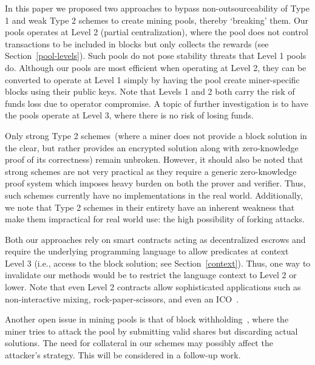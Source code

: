 \documentclass[runningheads]{llncs}
\begin{document}
In this paper we proposed two approaches to bypass non-outsourceability of Type 1 and weak Type 2
schemes to create mining pools, thereby `breaking' them. Our pools operates at Level 2 (partial centralization), where the pool does not  control transactions to be included in blocks but only collects the rewards (see Section~\ref{pool-levels}). Such pools do not pose stability threats that Level 1 pools do. Although our pools are most efficient when operating at Level 2, they can be converted to operate at Level 1 simply by having the pool create miner-specific blocks using their public keys. 
Note that Levels 1 and 2 both carry the risk of funds loss due to operator compromise. A topic of further investigation is to have the pools operate at Level 3, where there is no risk of losing funds. 

Only strong Type 2 schemes~(where a miner does not provide a block solution in the clear, but rather provides an encrypted solution
along with zero-knowledge proof of its correctness) remain unbroken. However, it should also be noted that strong schemes are not very practical as they require a generic zero-knowledge proof system which imposes heavy burden on both the  prover and verifier. Thus, such schemes currently have no implementations in the real world. Additionally, we note that Type 2 schemes in their entirety have an inherent weakness that make them impractical for real world use: the high possibility of forking attacks. 



Both our approaches rely on smart contracts acting as decentralized escrows and require the underlying programming language to allow predicates at context Level 3 (i.e., access to the block solution; see Section~\ref{context}). Thus, one way to invalidate our methods would be to restrict the language context to Level 2 or lower. Note that even Level 2 contracts allow sophisticated applications such as non-interactive mixing, rock-paper-scissors, and even an ICO~\cite{advtutorial}.

Another open issue in mining pools is that of block withholding~\cite{courtois2014subversive}, where the miner tries to attack the pool by submitting valid shares but discarding actual solutions. The need for collateral in our schemes may possibly affect the attacker's strategy. This will be considered in a follow-up work.




\appendix
\end{document}
